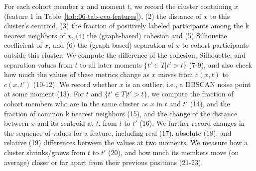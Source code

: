 \documentclass[
  oneside]{book}
\begin{document}
For each cohort member \(x\) and moment \(t\), we record the cluster containing \(x\) (feature 1 in Table~\ref{tab:06-tab-evo-features}),
(2) the distance of \(x\) to this cluster's centroid,
(3) the fraction of positively labeled participants among the k nearest neighbors of \(x\),
(4) the (graph-based) cohesion \autocite{TanDMbook} and (5) Silhouette coefficient \autocite{TanDMbook} of \(x\), and (6) the (graph-based) separation \autocite{TanDMbook} of \(x\) to cohort participants outside this cluster.
We compute the difference of the cohesion, Silhouette, and separation values from \(t\) to all later moments \(\{t' \in T|t'>t\}\) (7-9), and also check how much the values of these metrics change as \(x\) moves from \(c(x,t)\) to \(c(x,t')\) (10-12).
We record whether \(x\) is an outlier, i.e., a DBSCAN noise point at some moment (13).
For \(t\) and \(\{t' \in T|t'>t\}\), we compute the fraction of cohort members who are in the same cluster as \(x\) in \(t\) and \(t'\) (14), and the fraction of common k nearest neighbors (15), and the change of the distance between \(x\) and its centroid at \(t\), from \(t\) to \(t'\) (16).
We further record changes in the sequence of values for a feature, including real (17), absolute (18), and relative (19) differences between the values at two moments.
We measure how a cluster shrinks/grows from \(t\) to \(t'\) (20), and how much its members move (on average) closer or far apart from their previous positions (21-23).
\end{document}
